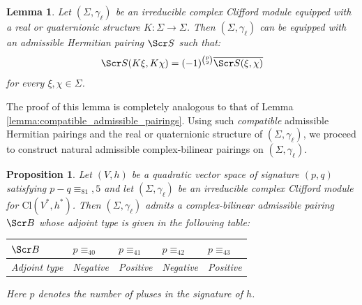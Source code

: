 \documentclass[10pt,a4paper,twoside,reqno]{amsart}
\theoremstyle{plain}
\newtheorem{prop}[thm]{Proposition}
\newtheorem{lemma}[thm]{Lemma}
\theoremstyle{definition}
\theoremstyle{remark}
\def\scB{\Scr B}
\def\scS{\Scr S}
\def\Cl{\mathrm{Cl}}
\begin{document}
\begin{lemma}
\label{lemma:compatible_admissible_pairingsodd}
Let $(\Sigma,\gamma_\ell)$ be an irreducible complex Clifford module equipped with a real or quaternionic structure $K\colon \Sigma \to \Sigma$. Then $(\Sigma,\gamma_\ell)$ can be equipped with an admissible Hermitian pairing $\scS$ such that:
\begin{equation*}
\scS(K\xi,K\chi)=(-1)^{\binom{p}{2}}\overline{\scS(\xi,\chi)}
\end{equation*}
 for every $\xi , \chi \in \Sigma$.
 \end{lemma}

\noindent
The proof of this lemma is completely analogous to that of Lemma \ref{lemma:compatible_admissible_pairings}. Using such \emph{compatible} admissible Hermitian pairings and the real or quaternionic structure of $(\Sigma,\gamma_\ell)$, we proceed to construct natural admissible complex-bilinear pairings on $(\Sigma,\gamma_\ell)$.

\begin{prop}
Let $(V,h)$ be a quadratic vector space of signature $(p,q)$ satisfying $p-q\equiv_81,5$ and let $(\Sigma,\gamma_\ell)$ be an irreducible complex Clifford module for $\Cl(V^*,h^*)$. Then $(\Sigma,\gamma_\ell)$ admits a complex-bilinear admissible pairing $\scB$ whose adjoint type is given in the following table: 
\begin{table}[H]
\centering
\begin{tabular}{l|llll}
\hline
$\scB $&$p\equiv_40$&$p\equiv_41$&$p\equiv_42$&$p\equiv_43$\\
\hline
Adjoint type&Negative&Positive&Negative&Positive\\
\hline
\end{tabular}
\end{table}

\noindent
Here $p$ denotes the number of pluses in the signature of $h$.
\end{prop}
\end{document}
